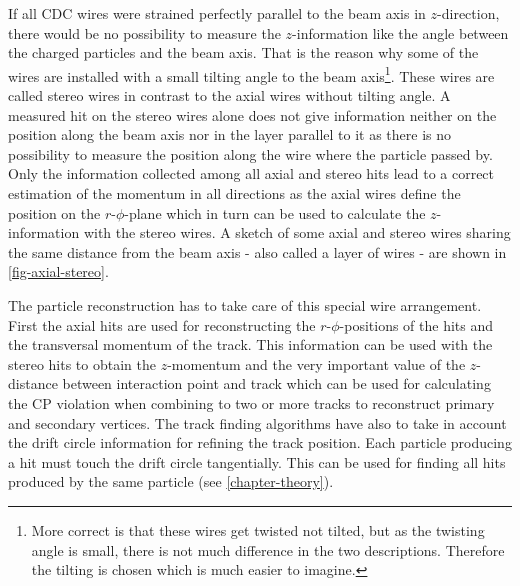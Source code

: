 If all CDC wires were strained perfectly parallel to the beam axis in $z$-direction, there would be no possibility to measure the $z$-information like the angle between the charged particles and the beam axis. That is the reason why some of the wires are installed with a small tilting angle to the beam axis\footnote{More correct is that these wires get twisted not tilted, but as the twisting angle is small, there is not much difference in the two descriptions. Therefore the tilting is chosen which is much easier to imagine.}. These wires are called stereo wires in contrast to the axial wires without tilting angle. A measured hit on the stereo wires alone does not give information neither on the position along the beam axis nor in the layer parallel to it as there is no possibility to measure the position along the wire where the particle passed by. Only the information collected among all axial and stereo hits lead to a correct estimation of the momentum in all directions as the axial wires define the position on the $r$-$\phi$-plane which in turn can be used to calculate the $z$-information with the stereo wires. A sketch of some axial and stereo wires sharing the same distance from the beam axis - also called a layer of wires - are shown in \ref{fig-axial-stereo}. 

The particle reconstruction has to take care of this special wire arrangement. First the axial hits are used for reconstructing the $r$-$\phi$-positions of the hits and the transversal momentum of the track. This information can be used with the stereo hits to obtain the $z$-momentum and the very important value of the $z$-distance between interaction point and track which can be used for calculating the CP violation when combining to two or more tracks to reconstruct primary and secondary vertices. The track finding algorithms have also to take in account the drift circle information for refining the track position. Each particle producing a hit must touch the drift circle tangentially. This can be used for finding all hits produced by the same particle (see \ref{chapter-theory}).

